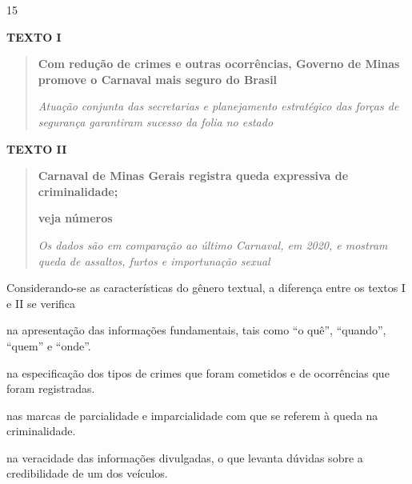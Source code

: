 \num{15}

\textbf{TEXTO I}

\begin{quote}
\textbf{Com redução de crimes e outras ocorrências, Governo de Minas
promove o Carnaval mais seguro do Brasil}

\emph{Atuação conjunta das secretarias e planejamento estratégico das
forças de segurança garantiram sucesso da folia no estado}
\end{quote}


\textbf{TEXTO II}

\begin{quote}
\textbf{Carnaval de Minas Gerais registra queda expressiva de
criminalidade;}

\textbf{veja números}

\emph{Os dados são em comparação ao último Carnaval, em 2020, e mostram
queda de assaltos, furtos e importunação sexual}
\end{quote}


Considerando-se as características do gênero textual, a diferença entre
os textos I e II se verifica

\begin{escolha}
\item na apresentação das informações fundamentais, tais como ``o quê'',
``quando'', ``quem'' e ``onde''.

\item na especificação dos tipos de crimes que foram cometidos e de
ocorrências que foram registradas.

\item nas marcas de parcialidade e imparcialidade com que se referem à
queda na criminalidade.

\item na veracidade das informações divulgadas, o que levanta dúvidas sobre
a credibilidade de um dos veículos.
\end{escolha}

